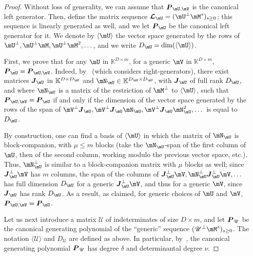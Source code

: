 \documentclass[12pt]{article}
\newcommand{\mat}[1]{\bm{\MakeUppercase{#1}}} %
\newcommand{\seqL}{\mat{\mathcal{L}}} %
\def\K{\mathbb{K}}
\def\K {\ensuremath{\mathbb{K}}}
\def\scrU {\ensuremath{\mathscr{U}}}
\begin{document}
\begin{proof}
  Without loss of generality, we can assume that $\mat{P}_{\mU,\mV}$
  is the canonical left generator. Then, define the matrix sequence
  $\seqL_{\mU} = (\mU^\perp\mM^s)_{s \ge 0}$; this sequence is
  linearly generated as well, and we let $\mat{P}_{\mU}$ be the
  canonical left generator for it.  We denote by $\langle \mU \rangle$
  the vector space generated by the rows of $\mU^\perp,\mU^\perp \mM,
  \mU^\perp{\mM^2},\dots$, and we write $D_\mU=\dim(\langle \mU
  \rangle)$.
	
  First, we prove that for any $\mU$ in $\K^{D \times m}$, for a
  generic $\mV$ in $\K^{D\times m}$,
  $\mat{P}_{\mU}=\mat{P}_{\mU,\mV}$.  Indeed,
  by~\cite[Lemma~4.2]{Villard97a} (which considers right-generators),
  there exist matrices $\mat{J}_\mU$ in $\K^{D\times D_\mU}$ and
  $\mN_\mU \in \K^{D_\mU \times D_\mU}$, with $\mat{J}_\mU$ of full
  rank $D_\mU$, and where $\mN_\mU$ is a matrix of the restriction of
  $\mM^\perp$ to $\langle \mU \rangle$, such that
  $\mat{P}_{\mU,\mV}=\mat{P}_{\mU}$ if and only if the dimension of
  the vector space generated by the rows of the span of
  $\mV^\perp\mat{J}_\mU, \mV^\perp \mat{J}_\mU \mN_\mU, \mV^\perp
  \mat{J}_\mU \mN_\mU^2,\dots$ is equal to $D_\mU$.
	
  By construction, one can find a basis of $\langle \mU \rangle$ in
  which the matrix of $\mN_\mU$ is block-companion, with $\mu \le m$
  blocks (take the $\mN_\mU$-span of the first column of $\mU$, then of
  the second column, working modulo the previous vector space, etc.). 
  Thus, $\mN^\perp_\mU$ is similar to a block-companion matrix with $\mu$
  blocks as well; since $\mat{J}_\mU^\perp \mV$ has $m$ columns, the span of
  the columns of
  $\mat{J}_\mU^\perp \mV,  \mN^\perp_\mU\mat{J}_\mU^\perp \mV,\dots$
 has full dimension $D_\mU$ for a
  generic $\mat{J}_\mU^\perp \mV$, and thus for a generic $\mV$, since $\mat{J}_\mU$ has rank
  $D_\mU$. As a result, as claimed, for generic choices of $\mU$ and $\mV$,
  $\mat{P}_{\mU,\mV}=\mat{P}_{\mU}$.
	
  Let us next introduce a matrix $\scrU$ of indeterminates of size $D
  \times m$, and let $\mat{P}_{\scrU}$ be the canonical generating
  polynomial of the ``generic'' sequence $(\scrU^\perp \mM^s)_{s \ge
    0}$. The notation $\langle \scrU \rangle$ and $D_\scrU$ are
  defined as above.  In particular,
  by~\cite[Proposition~6.1]{Villard97a}, the canonical generating
  polynomial $\mat{P}_{\scrU}$ has degree $\delta$ and determinantal
  degree $\nu$.
  

\end{proof}
\end{document}
